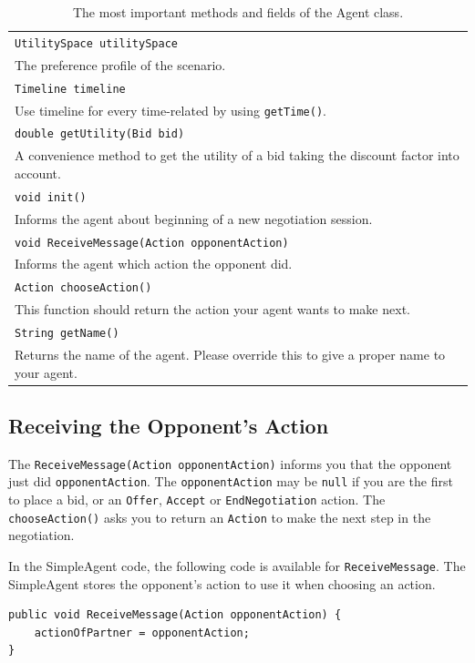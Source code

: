 \documentclass[]{article}
\begin{document}
\begin{table}
\begin{tabular}{m{}}
\hline
\texttt{UtilitySpace utilitySpace}\\
The preference profile of the scenario.\\
\hline
\texttt{Timeline timeline}\\
Use timeline for every time-related by using \texttt{getTime()}.\\
\hline
\texttt{double getUtility(Bid bid)}\\
A convenience method to get the utility of a bid taking the discount factor into account.\\
\hline
\texttt{void init()}\\
Informs the agent about beginning of a new negotiation session.\\
\hline
\texttt{void ReceiveMessage(Action opponentAction)}\\
Informs the agent which action the opponent did.\\
\hline
\texttt{Action chooseAction()}\\
This function should return the action your agent wants to make next.\\
\hline
\texttt{String getName()}\\
Returns the name of the agent. Please override this to give a proper name to your agent.\\
\hline
\end{tabular}
\caption{The most important methods and fields of the Agent class.}
\label{tab:agentclass}
\end{table}

\subsection{Receiving the Opponent's Action}
The \texttt{ReceiveMessage(Action opponentAction)} informs you that the opponent just did \texttt{opponentAction}. The \texttt{opponentAction} may be  \texttt{null} if you are the first to place a bid, or an \texttt{Offer}, \texttt{Accept} or \texttt{EndNegotiation} action.
The \texttt{chooseAction()} asks you to return an \texttt{Action} to make the next step in the negotiation.

In the SimpleAgent code, the following code is available for \texttt{ReceiveMessage}. The SimpleAgent stores the opponent's action to use it when choosing an action.

\begin{lstlisting}
public void ReceiveMessage(Action opponentAction) {
	actionOfPartner = opponentAction;
}
\end{lstlisting}
\end{document}
